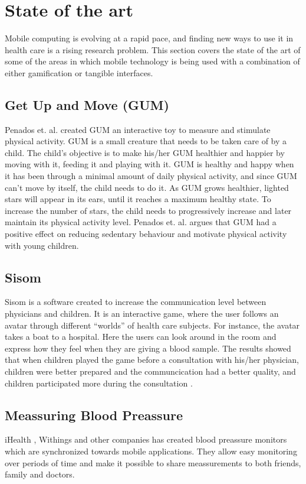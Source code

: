 \section{State of the art}
Mobile computing is evolving at a rapid pace, and finding new ways to use it in health care is a rising research problem. This section covers the state of the art of some of the areas in which mobile technology is being used with a combination of either gamification or tangible interfaces.   


\subsection{Get Up and Move (GUM)}
Penados et. al.\cite{penadosget} created GUM an interactive toy to measure and stimulate physical activity. GUM is a small creature that needs to be taken care of by a child. The child's objective is to make his/her GUM healthier and happier by moving with it, feeding it and playing with it. GUM is healthy and happy when it has been through a minimal amount of daily physical activity, and since GUM can't move by itself, the child needs to do it. As GUM grows healthier, lighted stars will appear in its ears, until it reaches a maximum healthy state. To increase the number of stars, the child needs to progressively increase and later maintain its physical activity level. Penados et. al. argues that GUM had a positive effect on reducing sedentary behaviour and motivate physical activity with young children.


\subsection{Sisom}
Sisom is a software created to increase the communication level between physicians and children. It is an interactive game, where the user follows an avatar through different ``worlds'' of health care subjects. For instance, the avatar takes a boat to a hospital. Here the users can look around in the room and express how they feel when they are giving a blood sample. The results showed that when children played the game before a consultation with his/her physician, children were better prepared and the communcication had a better quality, and children participated more during the consultation \cite{sisom-research}.


\subsection{Meassuring Blood Preassure}
iHealth , Withings and other companies has created blood preassure monitors which are synchronized towards mobile applications. They allow easy monitoring over periods of time and make it possible to share meassurements to both friends, family and doctors.


